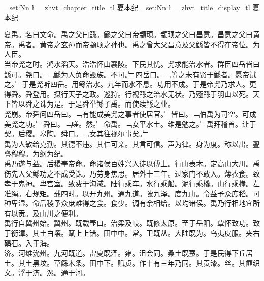 \documentclass{zhvt-classic}
\begin{document}
\clearpage
\ExplSyntaxOn
\tl_set:Nn \l__zhvt_chapter_title_tl { 夏本纪 }
\tl_set:Nn \l__zhvt_title_display_tl { 夏本纪 }
\ExplSyntaxOff
\maketitle






\hspace*{2em}夏禹。名曰文命。禹之父曰鲧。鲧之父曰帝颛顼。颛顼之父曰昌意。昌意之父曰黄帝。禹者。黄帝之玄孙而帝颛顼之孙也。禹之曾大父昌意及父鲧皆不得在帝位。为人臣。\\
\hspace*{2em}当帝尧之时。鸿水滔天。浩浩怀山襄陵。下民其忧。尧求能治水者。群臣四岳皆曰鲧可。尧曰。﹁鲧为人负命毁族。不可。﹂四岳曰。﹁等之未有贤于鲧者。愿帝试之。﹂于是尧听四岳。用鲧治水。九年而水不息。功用不成。于是帝尧乃求人。更得舜。舜登用。摄行天子之政。巡狩。行视鲧之治水无状。乃殛鲧于羽山以死。天下皆以舜之诛为是。于是舜举鲧子禹。而使续鲧之业。\\
\hspace*{2em}尧崩。帝舜问四岳曰。﹁有能成美尧之事者使居官。﹂皆曰。﹁伯禹为司空。可成美尧之功。﹂舜曰。﹁嗟。然。﹂命禹。﹁女平水土。维是勉之。﹂禹拜稽首。让于契。后稷。皋陶。舜曰。﹁女其往视尔事矣。﹂\\
\hspace*{2em}禹为人敏给克勤。其德不违。其仁可亲。其言可信。声为律。身为度。称以出。亹亹穆穆。为纲为纪。\\
\hspace*{2em}禹乃遂与益。后稷奉帝命。命诸侯百姓兴人徒以傅土。行山表木。定高山大川。禹伤先人父鲧功之不成受诛。乃劳身焦思。居外十三年。过家门不敢入。薄衣食。致孝于鬼神。卑宫室。致费于沟淢。陆行乘车。水行乘船。泥行乘橇。山行乘檋。左准绳。右规矩。载四时。以开九州。通九道。陂九泽。度九山。令益予众庶稻。可种卑湿。命后稷予众庶难得之食。食少。调有余相给。以均诸侯。禹乃行相地宜所有以贡。及山川之便利。\\
\hspace*{2em}禹行自冀州始。冀州。既载壶口。治梁及岐。既修太原。至于岳阳。覃怀致功。致于衡漳。其土白壤。赋上上错。田中中。常。卫既从。大陆既为。鸟夷皮服。夹右碣石。入于海。\\
\hspace*{2em}济。河维沇州。九河既道。雷夏既泽。雍。沮会同。桑土既蚕。于是民得下丘居土。其土黑坟。草繇木条。田中下。赋贞。作十有三年乃同。其贡漆。丝。其篚织文。浮于济。漯。通于河。\\
\end{document}
